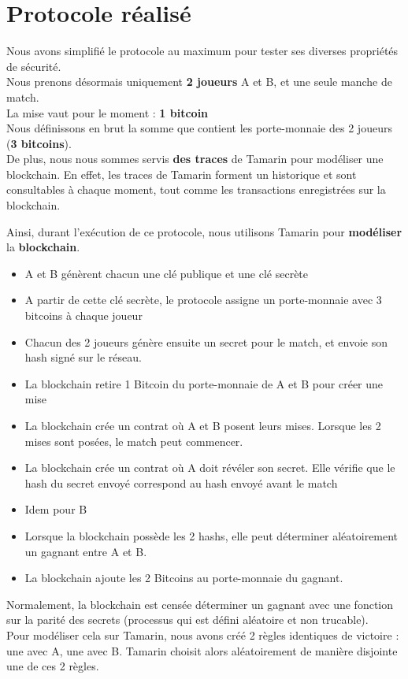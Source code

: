 \documentclass[conference]{IEEEtran}
\begin{document}
\section{Protocole réalisé}
Nous avons simplifié le protocole au maximum pour tester ses diverses propriétés de sécurité. \\

Nous prenons désormais uniquement \textbf{2 joueurs} A et B, et une seule manche de match. \\
La mise vaut pour le moment : \textbf{1 bitcoin} \\
Nous définissons en brut la somme que contient les porte-monnaie des 2 joueurs (\textbf{3 bitcoins}). \\

De plus, nous nous sommes servis \textbf{des traces} de Tamarin pour modéliser une blockchain. En effet, les traces de Tamarin forment un historique et sont consultables à chaque moment, tout comme les transactions enregistrées sur la blockchain.

Ainsi, durant l'exécution de ce protocole, nous utilisons Tamarin pour \textbf{modéliser} la \textbf{blockchain}. \\


\begin{itemize}
    \item A et B génèrent chacun une clé publique et une clé secrète
    \item A partir de cette clé secrète, le protocole assigne un porte-monnaie avec 3 bitcoins à chaque joueur
    \item Chacun des 2 joueurs génère ensuite un secret pour le match, et envoie son hash signé sur le réseau.
    \item La blockchain retire 1 Bitcoin du porte-monnaie de A et B pour créer une mise
    \item La blockchain crée un contrat où A et B posent leurs mises. Lorsque les 2 mises sont posées, le match peut commencer.
    \item La blockchain crée un contrat où A doit révéler son secret. Elle vérifie que le hash du secret envoyé correspond au hash envoyé avant le match
    \item Idem pour B
    \item Lorsque la blockchain possède les 2 hashs, elle peut déterminer aléatoirement un gagnant entre A et B.
    \item La blockchain ajoute les 2 Bitcoins au porte-monnaie du gagnant.
\end{itemize}
\vspace{0.2cm}
Normalement, la blockchain est censée déterminer un gagnant avec une fonction sur la parité des secrets (processus qui est défini aléatoire et non trucable). \\Pour modéliser cela sur Tamarin, nous avons créé 2 règles identiques de victoire : une avec A, une avec B. Tamarin choisit alors aléatoirement de manière disjointe une de ces 2 règles.\\
\end{document}

